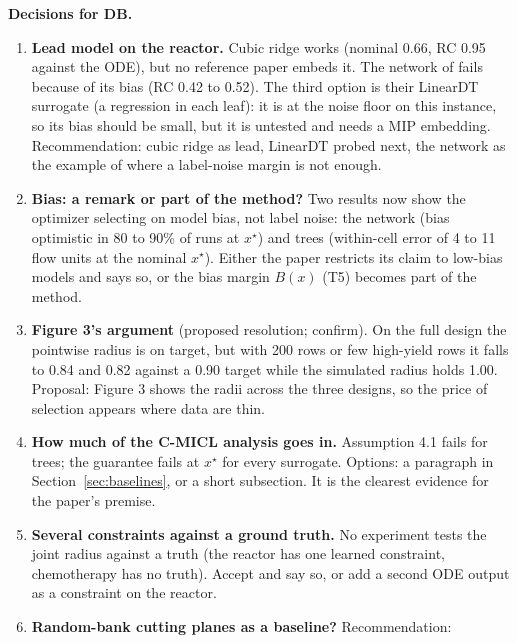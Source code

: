 \begin{tcolorbox}[breakable, colback=blue!3, colframe=blue!40!black,
  title={For JS and DB only; remove before circulating},
  fonttitle=\small\bfseries, left=4pt, right=4pt, top=3pt, bottom=3pt]

\textbf{Decisions for DB.}
\begin{enumerate}
  \item \textbf{Lead model on the reactor.} Cubic ridge works (nominal 0.66,
    RC 0.95 against the ODE), but no reference paper embeds it. The network of
    \citet{ovalle2025cmicl} fails because of its bias (RC 0.42 to 0.52). The
    third option is their LinearDT surrogate (a regression in each leaf): it
    is at the noise floor on this instance, so its bias should be small, but
    it is untested and needs a MIP embedding. Recommendation: cubic ridge as
    lead, LinearDT probed next, the network as the example of where a
    label-noise margin is not enough.
  \item \textbf{Bias: a remark or part of the method?} Two results now show
    the optimizer selecting on model bias, not label noise: the network (bias
    optimistic in 80 to 90\% of runs at $x^\star$) and trees (within-cell
    error of 4 to 11 flow units at the nominal $x^\star$). Either the paper
    restricts its claim to low-bias models and says so, or the bias margin
    $B(x)$ (T5) becomes part of the method.
  \item \textbf{Figure 3's argument} (proposed resolution; confirm). On the
    full design the pointwise radius is on target, but with 200 rows or few
    high-yield rows it falls to 0.84 and 0.82 against a 0.90 target while the
    simulated radius holds 1.00. Proposal: Figure 3 shows the radii across
    the three designs, so the price of selection appears where data are thin.
  \item \textbf{How much of the C-MICL analysis goes in.} Assumption 4.1
    fails for trees; the guarantee fails at $x^\star$ for every surrogate.
    Options: a paragraph in Section~\ref{sec:baselines}, or a short
    subsection. It is the clearest evidence for the paper's premise.
  \item \textbf{Several constraints against a ground truth.} No experiment
    tests the joint radius against a truth (the reactor has one learned
    constraint, chemotherapy has no truth). Accept and say so, or add a
    second ODE output as a constraint on the reactor.
  \item \textbf{Random-bank cutting planes as a baseline?} Recommendation:

\end{enumerate}
\end{tcolorbox}
